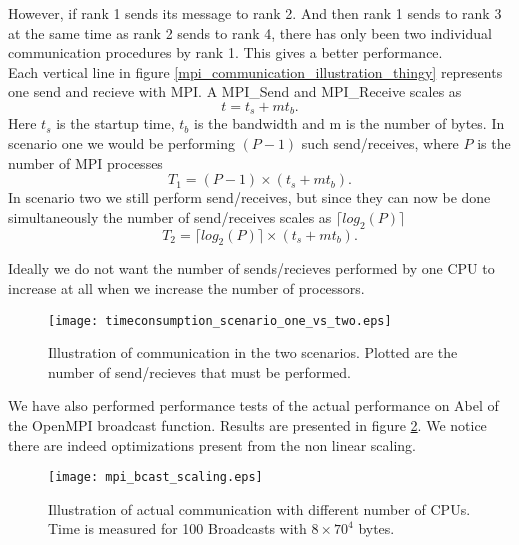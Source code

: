 \documentclass[a4paper,norsk,11pt,twoside]{report}
\begin{document}
However, if rank 1 sends its message to rank 2. And then rank 1 sends
to rank 3 at the same time as rank 2 sends to rank 4, there has only
been two individual communication procedures by rank 1. This gives a
better performance. \\

Each vertical line in figure
\ref{mpi_communication_illustration_thingy} represents one send and
recieve with MPI. A MPI\_Send and MPI\_Receive scales as
\begin{equation}
t = t_s + m t_b .
\end{equation}
Here $t_s$ is the startup time, $t_b$ is the bandwidth and m is the number of bytes. In scenario one we would be performing $(P-1)$ such send/receives, where $P$ is the number of MPI processes
\begin{equation}
T_1 = (P-1) \times (t_s + m t_b) .
\end{equation}
In scenario two we still perform send/receives, but since they can now
be done simultaneously the number of send/receives scales as $\lceil
log_2(P) \rceil$
\begin{equation}
T_2 = \lceil log_2(P) \rceil \times (t_s + m t_b) .
\end{equation}

Ideally we do not want the number of sends/recieves performed by one CPU to increase at all when we increase the number of processors. \\

\newpage

\begin{figure}[ht!]
\centering
\texttt{[image: timeconsumption\_scenario\_one\_vs\_two.eps]}
\caption{Illustration of communication in the two scenarios. Plotted are the number of send/recieves that must be performed.}
\label{mpi_communication_illustration_thingy2}
\end{figure}

We have also performed performance tests of the actual performance on Abel of
the OpenMPI broadcast function. Results are presented in figure
\ref{mpi_communication_real}. We notice there are indeed optimizations
present from the non linear scaling.
\begin{figure}[ht!]
\centering
\texttt{[image: mpi\_bcast\_scaling.eps]}
\caption{Illustration of actual communication with different number of CPUs. Time is measured for 100 Broadcasts with $8 \times 70^4$ bytes.}
\label{mpi_communication_real}
\end{figure}
\end{document}
